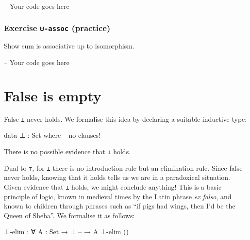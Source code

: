\begin{fence}
\begin{code}
-- Your code goes here
\end{code}
\end{fence}

\hypertarget{exercise--assoc-practice}{%
\subsubsection{\texorpdfstring{Exercise \texttt{⊎-assoc}
(practice)}{Exercise ⊎-assoc (practice)}}\label{exercise--assoc-practice}}

Show sum is associative up to isomorphism.

\begin{fence}
\begin{code}
-- Your code goes here
\end{code}
\end{fence}

\hypertarget{false-is-empty}{%
\section{False is empty}\label{false-is-empty}}

False \texttt{⊥} never holds. We formalise this idea by declaring a
suitable inductive type:

\begin{fence}
\begin{code}
data ⊥ : Set where
  -- no clauses!
\end{code}
\end{fence}

There is no possible evidence that \texttt{⊥} holds.

Dual to \texttt{⊤}, for \texttt{⊥} there is no introduction rule but an
elimination rule. Since false never holds, knowing that it holds tells
us we are in a paradoxical situation. Given evidence that \texttt{⊥}
holds, we might conclude anything! This is a basic principle of logic,
known in medieval times by the Latin phrase \emph{ex falso}, and known
to children through phrases such as ``if pigs had wings, then I'd be the
Queen of Sheba''. We formalise it as follows:

\begin{fence}
\begin{code}
⊥-elim : ∀ {A : Set}
  → ⊥
    --
  → A
⊥-elim ()
\end{code}
\end{fence}

